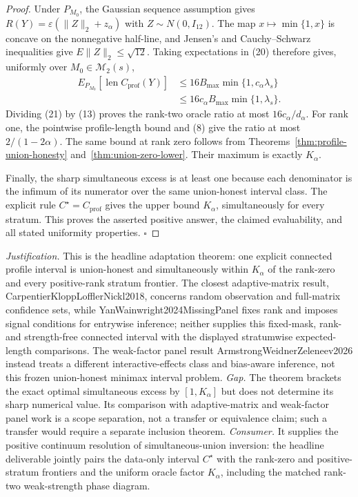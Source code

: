 \documentclass{article}
\begin{document}
\begin{proof}
Under \(P_{M_0}\), the Gaussian sequence assumption gives \(R(Y)=\varepsilon(\lVert Z\rVert_2+z_\alpha)\) with \(Z\sim N(0,I_{12})\).  The map \(x\mapsto\min\{1,x\}\) is concave on the nonnegative half-line, and Jensen's and Cauchy--Schwarz inequalities give \(E\lVert Z\rVert_2\leq\sqrt{12}\).  Taking expectations in (20) therefore gives, uniformly over \(M_0\in\mathcal M_2(s)\),
\[
 \begin{split}
 E_{P_{M_0}}[\operatorname{len}C_{\mathrm{prof}}(Y)]
 &\leq16B_{\max}\min\{1,c_\alpha\lambda_s\}\\
 &\leq16c_\alpha B_{\max}\min\{1,\lambda_s\}.
 \end{split}
\tag{21}
\]
Dividing (21) by (13) proves the rank-two oracle ratio at most \(16c_\alpha/d_\alpha\).  For rank one, the pointwise profile-length bound and (8) give the ratio at most \(2/(1-2\alpha)\).  The same bound at rank zero follows from Theorems~\ref{thm:profile-union-honesty} and~\ref{thm:union-zero-lower}.  Their maximum is exactly \(K_\alpha\).

Finally, the sharp simultaneous excess is at least one because each denominator is the infimum of its numerator over the same union-honest interval class.  The explicit rule \(C^\star=C_{\mathrm{prof}}\) gives the upper bound \(K_\alpha\), simultaneously for every stratum.  This proves the asserted positive answer, the claimed evaluability, and all stated uniformity properties. \(\square\)
\end{proof}
\par\smallskip\noindent \textit{Justification.} This is the headline adaptation theorem: one explicit connected profile interval is union-honest and simultaneously within \(K_\alpha\) of the rank-zero and every positive-rank stratum frontier. The closest adaptive-matrix result, CarpentierKloppLofflerNickl2018, concerns random observation and full-matrix confidence sets, while YanWainwright2024MissingPanel fixes rank and imposes signal conditions for entrywise inference; neither supplies this fixed-mask, rank- and strength-free connected interval with the displayed stratumwise expected-length comparisons. The weak-factor panel result ArmstrongWeidnerZeleneev2026 instead treats a different interactive-effects class and bias-aware inference, not this frozen union-honest minimax interval problem. \textit{Gap.} The theorem brackets the exact optimal simultaneous excess by \([1,K_\alpha]\) but does not determine its sharp numerical value. Its comparison with adaptive-matrix and weak-factor panel work is a scope separation, not a transfer or equivalence claim; such a transfer would require a separate inclusion theorem. \textit{Consumer.} It supplies the positive continuum resolution of simultaneous-union inversion: the headline deliverable jointly pairs the data-only interval \(C^\star\) with the rank-zero and positive-stratum frontiers and the uniform oracle factor \(K_\alpha\), including the matched rank-two weak-strength phase diagram.
\end{document}
